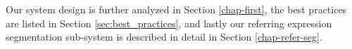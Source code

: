 \vspace{-2mm}
Our system design is further analyzed in Section \ref{chap-first}, the best practices are listed in Section \ref{sec:best_practices}, and lastly our referring expression segmentation sub-system is described in detail in Section \ref{chap-refer-seg}.
 
